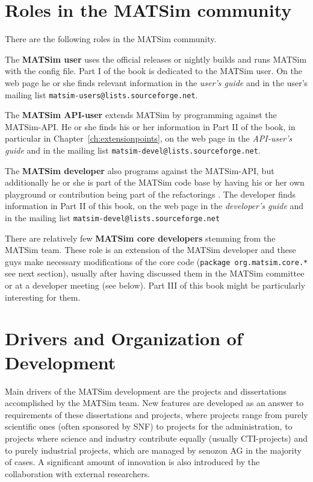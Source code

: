 \section{Roles in the MATSim community}
\label{sec:roles}
There are the following roles in the MATSim community.
%
\begin{compactitem}
\item The \textbf{MATSim user} uses the official releases or nightly builds and runs MATSim with the config file. Part I of the book is dedicated to the MATSim user. On the web page he or she finds relevant information in the \emph{user's guide} and in the user's mailing list \lstinline|matsim-users@lists.sourceforge.net|.
\item The \textbf{MATSim API-user} extends MATSim by programming against the MATSim-API. He or she finds his or her information in Part II of the book, in particular in Chapter~\ref{ch:extensionpoints}, on the web page in the \emph{API-user's guide} and in the mailing list \lstinline|matsim-devel@lists.sourceforge.net|.
\item The \textbf{MATSim developer} also programs against the MATSim-API, but additionally he or she is part of the MATSim code base by having his or her own playground or contribution being part of the refactorings  . The developer finds information in Part II of this book, on the web page in the \emph{developer's guide} and in the mailing list \lstinline|matsim-devel@lists.sourceforge.net| 
\item There are relatively few \textbf{MATSim core developers} stemming from the MATSim team. These role is an extension of the MATSim developer and these guys make necessary modifications of the core code (\lstinline|package org.matsim.core.*| see next section), usually after having discussed them in the MATSim committee or at a developer meeting (see below). Part III of this book might be particularly interesting for them.
\end{compactitem}
%
\section{Drivers and Organization of Development}
Main drivers of the MATSim development are the projects and dissertations accomplished by the MATSim team. New features are developed as an answer to requirements of these dissertations and projects, where projects range from purely scientific ones (often sponsored by SNF) to projects for the administration, to projects where science and industry contribute equally (usually CTI-projects) and to purely industrial projects, which are managed by senozon AG in the majority of cases. A significant amount of innovation is also introduced by the collaboration with external researchers.

